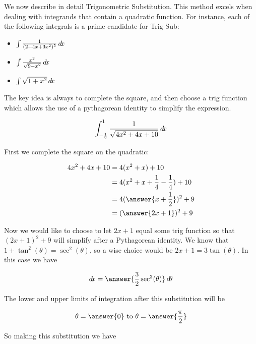 \documentclass{ximera}
\begin{document}
We now describe in detail Trigonometric Substitution. This method excels when dealing with integrands that contain a quadratic function.   For instance, each of the following integrals is a prime candidate for Trig Sub:

\begin{itemize}
\item $\int \frac{1}{(2+4x+3x^2)^5} \mathop{}\!d\! x$
\item $\int \frac{x^2}{\sqrt{9-x^2}} \mathop{}\!d\! x$
\item $\int \sqrt{1+x^2} \mathop{}\!d\! x$
\end{itemize}

The key idea is always to complete the square, and then choose a trig function which allows the use of a pythagorean identity to simplify the expression. 

\begin{example}

\[
\int_{-\frac{1}{2}}^1 \frac{1}{\sqrt{4x^2+4x+10}} \mathop{}\!d\! x
\]

First we complete the square on the quadratic:

\begin{align*}
	4x^2+4x+10 &= 4(x^2+x)+10\\
		&=4(x^2+x+\frac{1}{4} - \frac{1}{4})+10\\
		&=4(\answer{x+\frac{1}{2}})^2+9\\
		&=(\answer{2x+1})^2+9
\end{align*}

Now we would like to choose to let $2x+1$ equal some trig function so that $(2x+1)^2+9$ will simplify after a Pythagorean identity.  We know that $1+\tan^2(\theta) = \sec^2(\theta)$, so a wise choice would be $2x+1 = 3\tan(\theta)$.  In this case we have 

\[
\d x = \answer{\frac{3}{2} \sec^2(\theta)} \d \theta
\]

The lower and upper limits of integration after this substitution will be 

\[
\theta = \answer{0} \textrm{ to } \theta = \answer{\frac{\pi}{2}}
\]

So making this substitution we have


\end{example}
\end{document}
